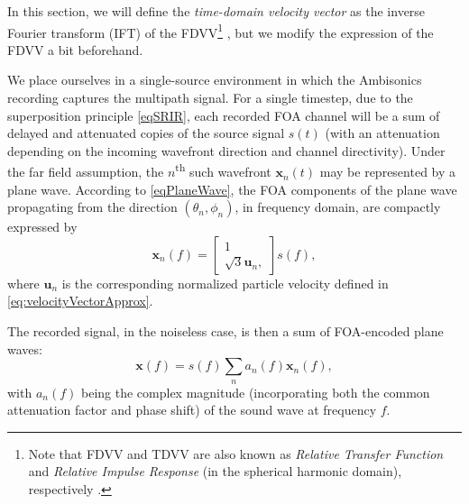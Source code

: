In this section, we will define the \textit{time-domain velocity vector} as the inverse Fourier transform (IFT) of the FDVV\footnote{Note that FDVV and TDVV are also known as \emph{Relative Transfer Function} and \emph{Relative Impulse Response} (in the spherical harmonic domain), respectively \cite{jarrett_theory_2017}.} \cite{daniel_time_2020}, but we modify the expression of the FDVV a bit beforehand.

We place ourselves in a single-source environment in which the Ambisonics recording captures the multipath signal. For a single timestep, due to the superposition principle \eqref{eqSRIR}, each recorded FOA channel will be a sum of delayed and attenuated copies of the source signal $s(t)$ (with an attenuation depending on the incoming wavefront direction and channel directivity). Under the far field assumption, the $n$\textsuperscript{th} such wavefront $\mathbf{x}_n(t)$ may be represented by a plane wave. According to \eqref{eqPlaneWave}, the FOA components of the plane wave propagating from the direction $(\theta_n,\phi_n)$, in frequency domain, are compactly expressed by
\begin{equation*}
    \mathbf{x}_n(f) = \left[ \begin{matrix} 1 \\ \sqrt{3} \mathbf{u}_n, \end{matrix} \right] s(f),
\end{equation*}
where $\mathbf{u}_n$ is the corresponding normalized particle velocity defined in \eqref{eq:velocityVectorApprox}.

The recorded signal, in the noiseless case, is then a sum of FOA-encoded plane waves:
\begin{equation*}
    \mathbf{x}(f) = s(f) \sum_{n} a_n(f) \mathbf{x}_n(f),
\end{equation*}
with $a_n(f)$ being the complex magnitude (incorporating both the common attenuation factor and phase shift) of the sound wave at frequency $f$.

